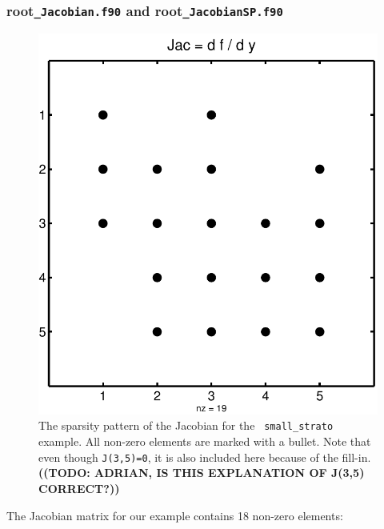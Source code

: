 \documentclass[twoside]{article}
\newcommand{\kpproot}{{\sc root}}
\newcommand{\todo}[1]{{{\color{red}\uppercase{\bf ((TODO: #1))}}}}
\begin{document}
\subsubsection{\kpproot{\tt\_Jacobian.f90} and \kpproot{\tt\_JacobianSP.f90}}
\label{sec:output-ode-jac}

\begin{figure}[htbp]
  \centering
  \includegraphics[width=0.8\columnwidth]{Figures/small_jac}
  \caption{The sparsity pattern of the Jacobian for the {\tt
      small\_strato} example. All non-zero elements are marked with a
    bullet. Note that even though {\tt J(3,5)=0}, it is also included
    here because of the fill-in. \todo{Adrian, is this explanation of
      J(3,5) correct?}}
  \label{fig:jac}
\end{figure}

The Jacobian matrix for our example contains 18 non-zero elements:
\end{document}
